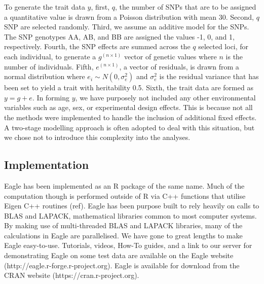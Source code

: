 \documentclass{article}
\begin{document}
To generate the trait data $y$, first, $q$, the number of SNPs that are to be assigned a quantitative value is drawn from a Poisson distribution with 
mean 30. Second, $q$ SNP are selected randomly. Third, we assume an additive model for the SNPs. The SNP genotypes AA, AB, and BB 
are assigned the values -1, 0, and 1, respectively. Fourth, the SNP effects are summed across the $q$ selected loci, for each individual, to 
generate a $g^{(n \times 1)}$ vector of genetic values where $n$ is the number of individuals. 
Fifth, $e^{(n \times 1)}$, a vector of residuals, is drawn from a normal distribution where $e_i \sim N(0, \sigma^2_e)$ and $\sigma^2_e$ is 
the residual variance that has been set to yield a trait with heritability 0.5. Sixth,  the trait data are formed as $y =  g + e$.  
In forming $y$, we have purposely not included any other environmental variables such as age, sex, or experimental design effects. This is because 
not all the methods were implemented to handle the inclusion of additional fixed effects. A two-stage modelling approach 
is often adopted to deal with this situation, but we chose not to introduce this complexity into the analyses.  



\subsection{Implementation}

Eagle has been implemented as an R package of the same name. Much of the computation though is performed outside of R 
via C++ functions that utilise Eigen C++ routines (ref). Eagle has been purpose built to rely heavily on calls to BLAS and LAPACK, 
mathematical libraries common to most computer systems. By making use of multi-threaded  BLAS and LAPACK libraries, many of the 
calculations in Eagle are parallelised. We have gone to great lengths to make Eagle easy-to-use. Tutorials, videos, How-To guides, and 
a link to our server for demonstrating Eagle on some test data are available on the Eagle website (http://eagle.r-forge.r-project.org).  
Eagle is available for download from the CRAN website (https://cran.r-project.org). 

  
  
\end{document}
